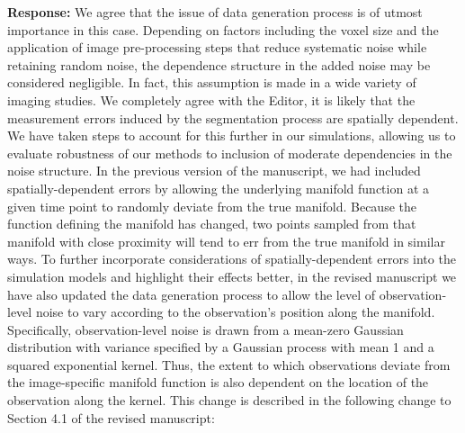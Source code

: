 \documentclass[12pt]{article}
\theoremstyle{definition}
\begin{document}
\begin{enumerate}
{\bf Response:} We agree that the issue of data generation process is of utmost importance in this case. Depending on factors including the voxel size and the application of image pre-processing steps that reduce systematic noise while retaining random noise, the dependence structure in the added noise may be considered negligible. In fact, this assumption is made in a wide variety of imaging studies. We completely agree with the Editor, it is likely that the measurement errors induced by the segmentation process are spatially dependent. We have taken steps to account for this further in our simulations, allowing us to evaluate robustness of our methods to inclusion of moderate dependencies in the noise structure. In the previous version of the manuscript, we had included spatially-dependent errors by allowing the underlying manifold function at a given time point to randomly deviate from the true manifold. Because the function defining the manifold has changed, two points sampled from that manifold with close proximity will tend to err from the true manifold in similar ways. To further incorporate considerations of spatially-dependent errors into the simulation models and highlight their effects better, in the revised manuscript we have also updated the data generation process to allow the level of observation-level noise to vary according to the observation's position along the manifold. Specifically, observation-level noise is drawn from a mean-zero Gaussian distribution with variance specified by a Gaussian process with mean 1 and a squared exponential kernel. Thus, the extent to which observations deviate from the image-specific manifold function is also dependent on the location of the observation along the kernel. This change is described in the following change to Section 4.1 of the revised manuscript:


\end{enumerate}
\end{document}

